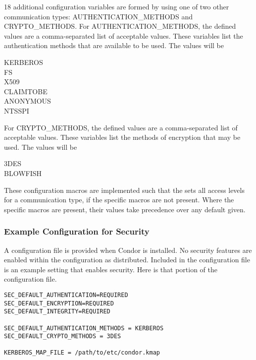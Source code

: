 18 additional configuration variables are formed by using one
of two other communication types:
AUTHENTICATION\_METHODS and
CRYPTO\_METHODS.
For AUTHENTICATION\_METHODS,
the defined values are a comma-separated list of acceptable values.
These variables list the authentication methods that are available
to be used.
The values will be 
\begin{description}
    \item[KERBEROS]
    \item[FS]
    \item[X509]
    \item[CLAIMTOBE]
    \item[ANONYMOUS]
    \item[NTSSPI]
\end{description}

For CRYPTO\_METHODS,
the defined values are a comma-separated list of acceptable values.
These variables list the methods of encryption that may be used.
The values will be 
\begin{description}
    \item[3DES]
    \item[BLOWFISH]
\end{description}

These configuration macros are implemented such that the
 sets all access levels for a
communication type, if the specific macros are not present.
Where the specific macros are present, their values take
precedence over any default given.

\subsubsection{\label{sec:Security-sample} Example Configuration for Security}

A configuration file is provided when Condor is installed.
No security features are enabled within the configuration as
distributed.
Included in the configuration file is an example setting
that enables security.
Here is that portion of the configuration file.

\begin{verbatim}
SEC_DEFAULT_AUTHENTICATION=REQUIRED
SEC_DEFAULT_ENCRYPTION=REQUIRED
SEC_DEFAULT_INTEGRITY=REQUIRED

SEC_DEFAULT_AUTHENTICATION_METHODS = KERBEROS
SEC_DEFAULT_CRYPTO_METHODS = 3DES

KERBEROS_MAP_FILE = /path/to/etc/condor.kmap

\end{verbatim}

